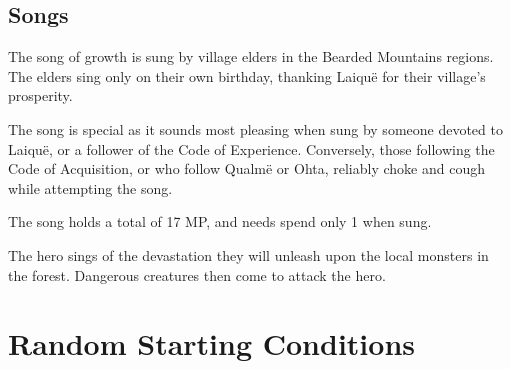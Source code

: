 \begin{multicols}{2}
\subsection{Songs}

\noindent The song of growth is sung by village elders in the Bearded Mountains regions.
The elders sing only on their own birthday, thanking Laiqu\"{e} for their village's prosperity.

\label{chokingsong}
The song is special as it sounds most pleasing when sung by someone devoted to Laiqu\"{e}, or a follower of the Code of Experience.
Conversely, those following the Code of Acquisition, or who follow Qualm\"{e} or Ohta, reliably choke and cough while attempting the song.

The song holds a total of 17 MP, and needs spend only 1 when sung.

\label{medalofheroism}

\noindent The hero sings of the devastation they will unleash upon the local monsters in the forest.
Dangerous creatures then come to attack the hero.

\end{multicols}

\section{Random Starting Conditions}

